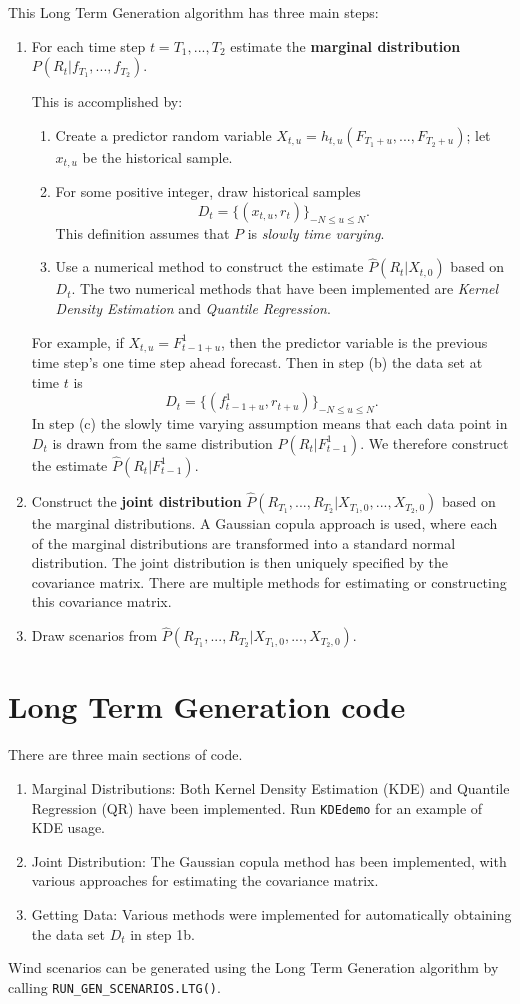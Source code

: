 \documentclass[10pt,a4paper]{article}
\begin{document}
\noindent This Long Term Generation algorithm has three main steps:

\begin{enumerate}
\item For each time step $t=T_1,...,T_2$ estimate the \textbf{marginal distribution} $P(R_t|f_{T_1},...,f_{T_2})$.

This is accomplished by:
\begin{enumerate}
\item Create a predictor random variable $X_{t,u}=h_{t,u}(F_{T_1+u},...,F_{T_2+u})$; let $x_{t,u}$ be the historical sample.
\item For some positive integer, draw historical samples 
$$D_t = \{ (x_{t,u},r_t) \}_{-N\leq u \leq N}.$$
This definition assumes that $P$ is \textit{slowly time varying}.
\item Use a numerical method to construct the estimate $\hat{P}(R_t|X_{t,0})$ based on $D_t$.  The two numerical methods that have been implemented are \textit{Kernel Density Estimation} and \textit{Quantile Regression}.
\end{enumerate}
For example, if $X_{t,u}=F_{t-1+u}^1$, then the predictor variable is the previous time step's one time step ahead forecast.  Then in step (b) the data set at time $t$ is
$$ D_t = \{ (f_{t-1+u}^1,r_{t+u}) \}_{-N \leq u \leq N}. $$
\noindent In step (c) the slowly time varying assumption means that each data point in $D_t$ is drawn from the same distribution $P(R_t|F_{t-1}^1)$.  We therefore construct the estimate $\hat{P}(R_t|F_{t-1}^1)$.

\item Construct the \textbf{joint distribution} $\hat{P}(R_{T_1},...,R_{T_2}|X_{T_1,0},...,X_{T_2,0})$ based on the marginal distributions.  A Gaussian copula approach is used, where each of the marginal distributions are transformed into a standard normal distribution.  The joint distribution is then uniquely specified by the covariance matrix.  There are multiple methods for estimating or constructing this covariance matrix.
\item Draw scenarios from $\hat{P}(R_{T_1},...,R_{T_2}|X_{T_1,0},...,X_{T_2,0})$.
\end{enumerate}

\section{Long Term Generation code}
There are three main sections of code.

\begin{enumerate}
\item Marginal Distributions:  Both Kernel Density Estimation (KDE) and Quantile Regression (QR) have been implemented.  Run \texttt{KDEdemo} for an example of KDE usage.
\item Joint Distribution: The Gaussian copula method has been implemented, with various approaches for estimating the covariance matrix.
\item Getting Data: Various methods were implemented for automatically obtaining the data set $D_t$ in step 1b.
\end{enumerate}

Wind scenarios can be generated using the Long Term Generation algorithm by calling \texttt{RUN\_GEN\_SCENARIOS.LTG()}.
\end{document}
